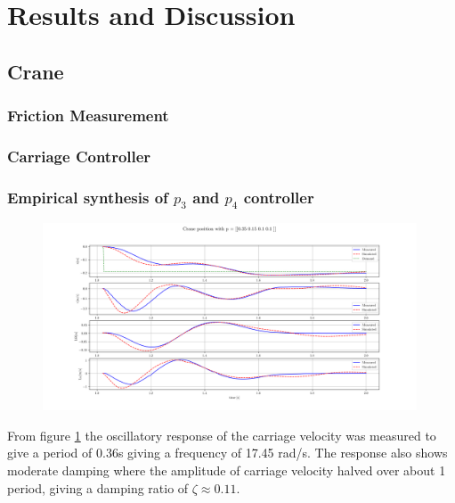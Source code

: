 \documentclass{article}
\begin{document}
\section{Results and Discussion}

\subsection{Crane}

\subsubsection{Friction Measurement}

\subsubsection{Carriage Controller}

\subsubsection{Empirical synthesis of $p_3$ and $p_4$ controller}

\begin{figure}[H]
  \centering
  \includegraphics[width=0.99\textwidth]{figures/3.3.png}
  \caption{}
  \label{fig:exp3.3}
\end{figure}

From figure \ref{fig:exp3.3} the oscillatory response of the carriage velocity was measured to give a period of 0.36s giving a frequency of 17.45 rad/s.
The response also shows moderate damping where the amplitude of carriage velocity halved over about 1 period, giving a damping ratio of $\zeta \approx 0.11$.
\end{document}
